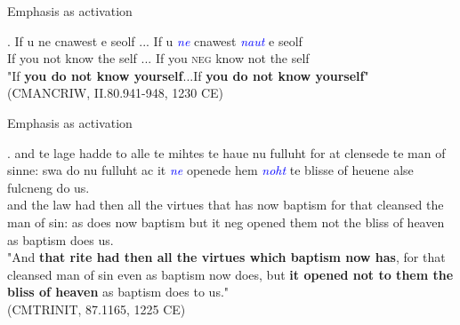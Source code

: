 \documentclass[compress]{beamer}
\begin{document}
%
%


\begin{frame}{Emphasis as activation}

\exg. If u ne cnawest e seolf ... If u \emph{\textcolor{blue}{ne}} cnawest \emph{\textcolor{blue}{naut}} e seolf\\
If you not know the self ... If you \textsc{neg} know not the self\\
"If \textbf{you do not know yourself}...If \textbf{you do not know yourself}"\\ 

    \vfill\hfill (CMANCRIW, II.80.941-948, 1230 CE)
\end{frame}


\begin{frame}{Emphasis as activation}

\exg. and te lage hadde to alle te mihtes te haue nu fulluht for at clensede te man of sinne: swa do nu fulluht ac it \emph{\textcolor{blue}{ne}} openede hem \emph{\textcolor{blue}{noht}} te blisse of heuene alse fulcneng do us.\\
and the law had then all the virtues that has now baptism for that cleansed the man of sin: as does now baptism but it neg opened them not the bliss of heaven as baptism does us.\\
"And \textbf{that rite had then all the virtues which baptism now has}, for that cleansed man of sin even as baptism now does, but \textbf{it opened not to them the bliss of heaven} as baptism does to us."\\

    \vfill\hfill (CMTRINIT, 87.1165, 1225 CE)
\end{frame}
\end{document}
